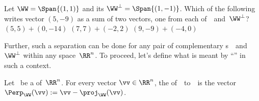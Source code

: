 \begin{activity}
Let  \(\WW=\Span\{(1,1)\}\) and its  \(\WW^\perp=\Span\{(1,-1)\}\).  
Which of the following writes vector \((5,-9)\) as a sum of two vectors, one from each of~\WW\ and~\(\WW^\perp\)?
{\((5,5)+(0,-14)\)}
{\((7,7)+(-2,2)\)}
{\((9,-9)+(-4,0)\)}
\end{activity}




Further, such a separation can be done for any pair of complementary s~\WW\ and~\(\WW^\perp\) within any space~\(\RR^n\).
To proceed, let's define what is meant by ``\Perp'' in such a context.


\begin{definition} \label{def:perpn}
Let \WW\ be a  of~\(\RR^n\).
For every vector \(\vv\in\RR^n\), the  of~\vv\  to~\WW\ is the vector
\(\Perp_\WW(\vv):=\vv-\proj_{\WW}(\vv)\).
\end{definition}




